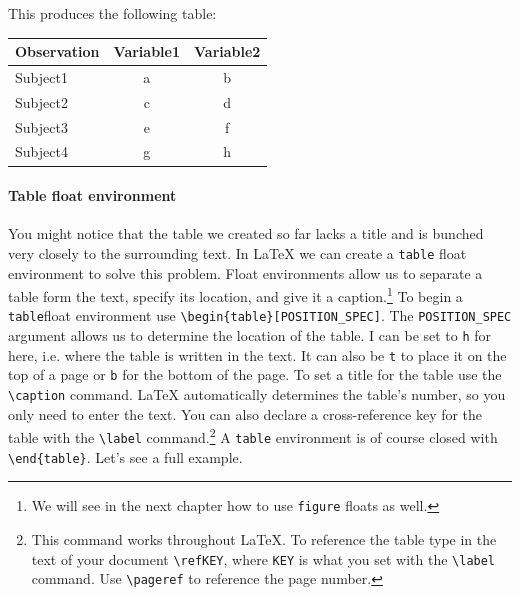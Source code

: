 \noindent This produces the following table:

\begin{tabular}{l | c c}
    \hline
    Observation & Variable1 & Variable2 \\
    \hline \hline
    Subject1 & a & b \\
    Subject2 & c & d \\
    Subject3 & e & f \\
    Subject4 & g & h \\
    \hline
\end{tabular}

\paragraph{Table float environment}

You might notice that the table we created so far lacks a title and is bunched very closely to the surrounding text. In LaTeX we can create a \texttt{table} float environment to solve this problem. Float environments allow us to separate a table form the text, specify its location, and give it a caption.\footnote{We will see in the next chapter how to use \texttt{figure} floats as well.} To begin a \texttt{table}float environment use \verb|\begin{table}[POSITION_SPEC]|. The \verb|POSITION_SPEC| argument allows us to determine the location of the table. I can be set to \texttt{h} for here, i.e. where the table is written in the text. It can also be \texttt{t} to place it on the top of a page or \texttt{b} for the bottom of the page. To set a title for the table use the \verb|\caption| command. LaTeX automatically determines the table's number, so you only need to enter the text. You can also declare a cross-reference key for the table with the \verb|\label| command.\footnote{This command works throughout LaTeX. To reference the table type in the text of your document \texttt{\textbackslash{}ref{KEY}}, where \texttt{KEY} is what you set with the \texttt{\textbackslash{}label} command. Use \texttt{\textbackslash{}pageref} to reference the page number.} A \texttt{table} environment is of course closed with \verb|\end{table}|. Let's see a full example.

